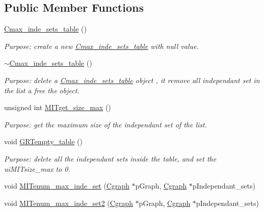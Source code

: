 \subsection*{Public Member Functions}
\begin{DoxyCompactItemize}
\item 
\hyperlink{class_cmax__inde__sets__table_a39fc5527f19ec28901ebc62407895dc9}{Cmax\+\_\+inde\+\_\+sets\+\_\+table} ()
\begin{DoxyCompactList}\small\item\em Purpose\+: create a new \hyperlink{class_cmax__inde__sets__table}{Cmax\+\_\+inde\+\_\+sets\+\_\+table} with null value. \end{DoxyCompactList}\item 
\hyperlink{class_cmax__inde__sets__table_ab80f89eb0991ad10c416082717822d9d}{$\sim$\+Cmax\+\_\+inde\+\_\+sets\+\_\+table} ()
\begin{DoxyCompactList}\small\item\em Purpose\+: delete a \hyperlink{class_cmax__inde__sets__table}{Cmax\+\_\+inde\+\_\+sets\+\_\+table} object , it remove all independant set in the list a free the object. \end{DoxyCompactList}\item 
unsigned int \hyperlink{class_cmax__inde__sets__table_a36ec7fecff6ba7547a936dbb964b9572}{M\+I\+Tget\+\_\+size\+\_\+max} ()
\begin{DoxyCompactList}\small\item\em Purpose\+: get the maximum size of the independant set of the list. \end{DoxyCompactList}\item 
void \hyperlink{class_cmax__inde__sets__table_ae5b5c5509b580597701d26d8a5a45faa}{G\+R\+Tempty\+\_\+table} ()
\begin{DoxyCompactList}\small\item\em Purpose\+: delete all the independant sets inside the table, and set the ui\+M\+I\+Tsize\+\_\+max to 0. \end{DoxyCompactList}\item 
void \hyperlink{class_cmax__inde__sets__table_a15a4bbf3ad99d6411cc79a2b3ab924c6}{M\+I\+Tenum\+\_\+max\+\_\+inde\+\_\+set} (\hyperlink{class_cgraph}{Cgraph} $\ast$p\+Graph, \hyperlink{class_cgraph}{Cgraph} $\ast$p\+Independant\+\_\+sets)
\item 
void \hyperlink{class_cmax__inde__sets__table_ac1ea1bfbfe3c4dfdef3e966529f88c1f}{M\+I\+Tenum\+\_\+max\+\_\+inde\+\_\+set2} (\hyperlink{class_cgraph}{Cgraph} $\ast$p\+Graph, \hyperlink{class_cgraph}{Cgraph} $\ast$p\+Independant\+\_\+sets)

\end{DoxyCompactItemize}
